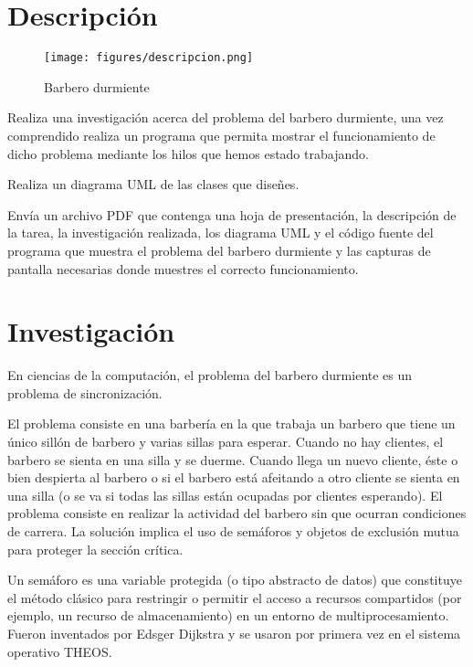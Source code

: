 \documentclass[12pt]{article}
\author{Pablo Vargas Bermúdez}
\begin{document}
\pagestyle{empty}



\section*{Descripción}

\begin{figure}[H]
  \centering
  \texttt{[image: figures/descripcion.png]}
  \caption{Barbero durmiente}
\end{figure}


Realiza una investigación acerca del problema del barbero durmiente,
una vez comprendido realiza un programa que permita mostrar el
funcionamiento de dicho problema mediante los hilos que hemos estado
trabajando.

Realiza un diagrama  UML de las clases que diseñes.

Envía un archivo PDF que contenga una hoja de presentación, la
descripción de la tarea, la investigación realizada, los diagrama UML
y el código fuente del programa que muestra el problema del barbero
durmiente y las capturas de pantalla necesarias donde muestres el
correcto funcionamiento.

\section*{Investigación}

En ciencias de la computación, el problema del barbero durmiente es un
problema de sincronización.

El problema consiste en una barbería en la que trabaja un barbero que
tiene un único sillón de barbero y varias sillas para esperar. Cuando
no hay clientes, el barbero se sienta en una silla y se duerme. Cuando
llega un nuevo cliente, éste o bien despierta al barbero o si el
barbero está afeitando a otro cliente se sienta en una silla (o se va
si todas las sillas están ocupadas por clientes esperando). El
problema consiste en realizar la actividad del barbero sin que ocurran
condiciones de carrera. La solución implica el uso de semáforos y
objetos de exclusión mutua para proteger la sección crítica.

Un semáforo es una variable protegida (o tipo abstracto de datos) que
constituye el método clásico para restringir o permitir el acceso a
recursos compartidos (por ejemplo, un recurso de almacenamiento) en un
entorno de multiprocesamiento. Fueron inventados por Edsger Dijkstra y
se usaron por primera vez en el sistema operativo THEOS.
\end{document}
